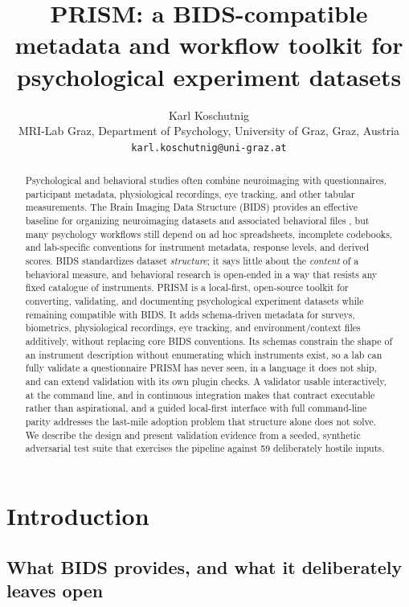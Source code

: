 \documentclass[10pt]{article}
\title{PRISM: a BIDS-compatible metadata and workflow toolkit for psychological experiment datasets}
\author{
  Karl Koschutnig\orcidlink{0000-0001-6234-0498}\\
  \small MRI-Lab Graz, Department of Psychology, University of Graz, Graz, Austria\\
  \small \texttt{karl.koschutnig@uni-graz.at}
}
\date{}
\begin{document}
\maketitle

\begin{abstract}
Psychological and behavioral studies often combine neuroimaging with
questionnaires, participant metadata, physiological recordings, eye tracking,
and other tabular measurements. The Brain Imaging Data Structure (BIDS)
provides an effective baseline for organizing neuroimaging datasets and
associated behavioral files \citep{gorgolewski2016bids}, but many psychology
workflows still depend on ad hoc spreadsheets, incomplete codebooks, and
lab-specific conventions for instrument metadata, response levels, and
derived scores. BIDS standardizes dataset \emph{structure}; it says little
about the \emph{content} of a behavioral measure, and behavioral research is
open-ended in a way that resists any fixed catalogue of instruments. PRISM
is a local-first, open-source toolkit for converting, validating, and
documenting psychological experiment datasets while remaining compatible
with BIDS. It adds schema-driven metadata for surveys, biometrics,
physiological recordings, eye tracking, and environment/context files
additively, without replacing core BIDS conventions. Its schemas constrain
the shape of an instrument description without enumerating which
instruments exist, so a lab can fully validate a questionnaire PRISM has
never seen, in a language it does not ship, and can extend validation with
its own plugin checks. A validator usable interactively, at the command
line, and in continuous integration makes that contract executable rather
than aspirational, and a guided local-first interface with full
command-line parity addresses the last-mile adoption problem that structure
alone does not solve. We describe the design and present validation
evidence from a seeded, synthetic adversarial test suite that exercises the
pipeline against 59 deliberately hostile inputs.
\end{abstract}

\section{Introduction}

\subsection{What BIDS provides, and what it deliberately leaves open}
\end{document}
